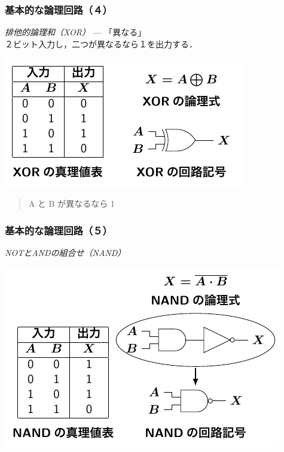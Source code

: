 \documentclass{beamer}                 %
\begin{document}
\begin{frame}
  \frametitle{基本的な論理回路（４）}
  \emph{排他的論理和（XOR）} --- 「異なる」\\
  \vfill
  ２ビット入力し，二つが異なるなら１を出力する．
  \centerline{\includegraphics[scale=1.4]{../Tikz/xor.pdf}}
  \begin{quote}
    A と B が異なるなら 1\\
  \end{quote}
  \vfill
\end{frame}

\begin{frame}
  \frametitle{基本的な論理回路（５）}
  \emph{NOTとANDの組合せ（NAND）} \\
  \vfill
  \centerline{\includegraphics[scale=1.3]{../Tikz/nand.pdf}}
  \vfill
\end{frame}
\end{document}
